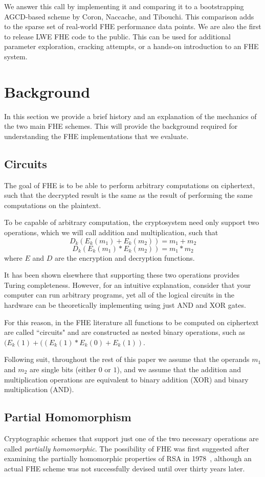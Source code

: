 \documentclass[letterpaper,twocolumn,10pt]{article}
\begin{document}
We answer this call by implementing it and comparing it to a bootstrapping AGCD-based scheme by Coron, Naccache, and Tibouchi. This comparison adds to the sparse set of real-world FHE performance data points. We are also the first to release LWE FHE code to the public. This can be used for additional parameter exploration, cracking attempts, or a hands-on introduction to an FHE system.


\section{Background}
In this section we provide a brief history and an explanation of the mechanics of the two main FHE schemes. This will provide the background required for understanding the FHE implementations that we evaluate.

\subsection{Circuits}
The goal of FHE is to be able to perform arbitrary computations on ciphertext, such that the decrypted result is the same as the result of performing the same computations on the plaintext.

To be capable of arbitrary computation, the cryptosystem need only support two operations, which we will call addition and multiplication, such that
$$D_k(E_k(m_1) + E_k(m_2)) = m_1 + m_2$$
$$D_k(E_k(m_1) * E_k(m_2)) = m_1 * m_2$$
where $E$ and $D$ are the encryption and decryption functions.

It has been shown elsewhere that supporting these two operations provides Turing completeness. However, for an intuitive explanation, consider that your computer can run arbitrary programs, yet all of the logical circuits in the hardware can be theoretically implementing using just AND and XOR gates. 

For this reason, in the FHE literature all functions to be computed on ciphertext are called ``circuits" and are constructed as nested binary operations, such as $(E_k(1)+((E_k(1)*E_k(0)+E_k(1))$.

Following suit, throughout the rest of this paper we assume that the operands $m_1$ and $m_2$ are single bits (either $0$ or $1$), and we assume that the addition and multiplication operations are equivalent to binary addition (XOR) and binary multiplication (AND).

\subsection{Partial Homomorphism}
Cryptographic schemes that support just one of the two necessary operations are called \emph{partially homomorphic}. The possibility of FHE was first suggested after examining the partially homomorphic properties of RSA in 1978~\cite{Rivest}, although an actual FHE scheme was not successfully devised until over thirty years later.
\end{document}
